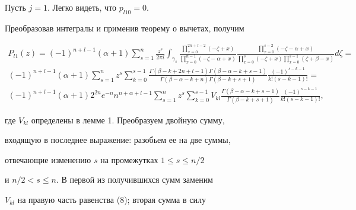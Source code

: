 


\begin{pf} 


Пусть $j=1$. Легко видеть, что $p_{l10}=0$. 


Преобразовав интегралы и применив теорему о вычетах, получим 


\begin{multline*} 


P_{l1}(z)=(-1)^{n+l-1}(\alpha+1)\sum^n_{s=1} 


\frac{z^s}{2\pi i}\int_{\gamma_s} 


\frac{\prod\limits^{2n+l-2}_{x=0}(-\zeta+x)} 


{\prod\limits^{n-1}_{x=0}(-\zeta-\alpha+x)}


\frac{\prod\limits^{s-2}_{x=0}(-\zeta-\alpha+x)} 


{\prod\limits^s_{x=0}(-\zeta+x)\prod\limits^{s-1}_{x=0} 


(\zeta+\beta-x)}d\zeta= \\


%


(-1)^{n+l-1}(\alpha+1) 


\sum^n_{s=1}z^s\sum^{s-1}_{k=0} 


\frac{\Gamma(\beta-k+2n+l-1)\Gamma(\beta-\alpha-k+s-1)} 


{\Gamma(\beta-\alpha-k+n)\Gamma(\beta-k+s+1)} 


\frac{(-1)^{s-k-1}}{k!(s-k-1)!}= \\


%


(-1)^{n+l-1}(\alpha+1)2^{2n}e^{-n} 


n^{n+\alpha+l-1}


\sum^n_{s=1}z^s\sum^{s-1}_{k=0}V_{kl} 


\frac{\Gamma(\beta-\alpha-k+s-1)}{\Gamma(\beta-k+s+1)} 


\frac{(-1)^{s-k-1}}{k!(s-k-1)!}, 


\end{multline*} 


где $V_{kl}$ определены в лемме 1. Преобразуем двойную сумму, 


входящую в последнее выражение: разобьем ее на две суммы, 


отвечающие изменению $s$ на промежутках $1\le s\le n/2$ 


и $n/2<s\le n$. В первой из получившихся сумм заменим 


$V_{kl}$ на правую часть равенства (8); вторая сумма в силу 



\end{pf}
